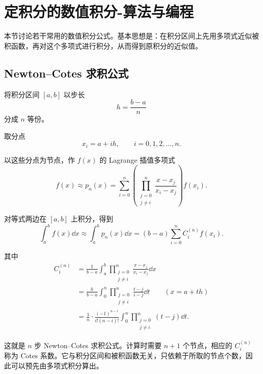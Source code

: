 \section{定积分的数值积分-算法与编程}
本节讨论若干常用的数值积分公式。基本思想是：在积分区间上先用多项式近似被积函数，再对这个多项式进行积分，从而得到原积分的近似值。

\subsection*{Newton--Cotes 求积公式}

将积分区间 $[a,b]$ 以步长
\[
h=\frac{b-a}{n}
\]
分成 $n$ 等份。

取分点
\[
x_i=a+ih,\qquad i=0,1,2,\dots,n.
\]

以这些分点为节点，作 $f(x)$ 的 Lagrange 插值多项式
\[
f(x)\approx p_n(x)
=\sum_{i=0}^{n}\left(\prod_{\substack{j=0\\j\ne i}}^{n}
\frac{x-x_j}{x_i-x_j}\right)f(x_i).
\]

对等式两边在 $[a,b]$ 上积分，得到
\[
\int_a^b f(x)\dd x
\approx \int_a^b p_n(x)\dd x
=(b-a)\sum_{i=0}^{n} C_i^{(n)}f(x_i).
\]

其中
\[
\begin{aligned}
	C_i^{(n)}
	&=\frac1{b-a}\int_a^b
	\prod_{\substack{j=0\\j\ne i}}^n\frac{x-x_j}{x_i-x_j}\dd x \\[4pt]
	&=\frac{h}{b-a}\int_0^n
	\prod_{\substack{j=0\\j\ne i}}^n\frac{t-j}{i-j}\dd t
	\qquad (x=a+th) \\[4pt]
	&=\frac1n\cdot \frac{(-1)^{n-i}}{i!(n-i)!}
	\int_0^n\prod_{\substack{j=0\\j\ne i}}^n(t-j)\dd t.
\end{aligned}
\]

这就是 $n$ 步 Newton--Cotes 求积公式。计算时需要 $n+1$ 个节点，相应的 $C_i^{(n)}$ 称为 Cotes 系数。它与积分区间和被积函数无关，只依赖于所取的节点个数，因此可以预先由多项式积分算出。

